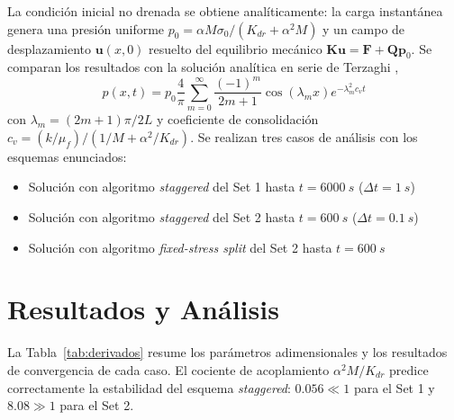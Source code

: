 \documentclass[twocolumn, a4paper]{article}
\begin{document}
    \quad La condición inicial no drenada se obtiene analíticamente: la carga
    instantánea genera una presión uniforme
    $p_0=\alpha M \sigma_0/(K_{dr}+\alpha^2 M)$ y un campo de desplazamiento
    $\bm{u}(x,0)$ resuelto del equilibrio mecánico $\bm{K}\bm{u}=\bm{F}+\bm{Q}\bm{p}_0$.
    Se comparan los resultados con la solución analítica en serie de Terzaghi
    \cite{terzaghi1943}, \begin{equation}p(x,t)=p_0\frac{4}{\pi}\sum_{m=0}^{\infty}\frac{(-1)^m}{2m+1}\cos(\lambda_m x)e^{-\lambda_m^2 c_v t}\end{equation}
    con $\lambda_m=(2m+1)\pi/2L$ y coeficiente de consolidación
    $c_v=(k/\mu_f)/(1/M+\alpha^2/K_{dr})$. Se realizan tres casos de análisis con los esquemas enunciados: 
    \begin{itemize}
        \item Solución con algoritmo \textit{staggered} del Set 1 hasta $t=\SI{6000}{s}$ ($\Delta t=\SI{1}{s}$)
        \item Solución con algoritmo \textit{staggered} del Set 2 hasta $t=\SI{600}{s}$ ($\Delta t=\SI{0.1}{s}$)
        \item Solución con algoritmo \textit{fixed-stress split} del Set 2 hasta $t=\SI{600}{s}$
    \end{itemize}

    \section{Resultados y Análisis}
    \quad La Tabla~\ref{tab:derivados} resume los parámetros adimensionales y los
    resultados de convergencia de cada caso. El cociente de acoplamiento
    $\alpha^2 M/K_{dr}$ predice correctamente la estabilidad del esquema
    \textit{staggered}: $0.056\ll1$ para el Set 1 y $8.08\gg1$ para el Set 2.

    \begin{table}[H]
    \centering
    \caption{Parámetros derivados y desempeño de los esquemas de acoplamiento. El
    \textit{staggered} del Set 2 diverge ($\alpha^2M/K_{dr}>1$); el
    \textit{fixed-stress} converge en $\sim2$ iteraciones (tol $=10^{-6}$).}
    \label{tab:derivados}
    \end{table}
\end{document}
